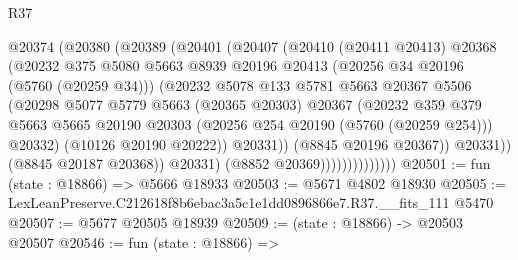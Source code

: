 \begin{lexlean}{R37}
\begin{coremodule}
                            @20374
                              (@20380
                                (@20389
                                  (@20401
                                    (@20407
                                      (@20410
                                        (@20411 @20413)
                                        @20368
                                        (@20232
                                          @375
                                          @5080
                                          @5663
                                          @8939
                                          @20196
                                          @20413
                                          (@20256 @34 @20196 (@5760 (@20259 @34)))
                                          (@20232
                                            @5078
                                            @133
                                            @5781
                                            @5663
                                            @20367
                                            @5506
                                            (@20298
                                              @5077
                                              @5779
                                              @5663
                                              (@20365 @20303)
                                              @20367
                                              (@20232
                                                @359
                                                @379
                                                @5663
                                                @5665
                                                @20190
                                                @20303
                                                (@20256 @254 @20190 (@5760 (@20259 @254)))
                                                @20332)
                                              (@10126 @20190 @20222))
                                            @20331))
                                        (@8845 @20196 @20367))
                                      @20331))
                                  (@8845 @20187 @20368))
                                @20331)
                              (@8852 @20369))))))))))))))
@20501 := fun (state : @18866) => @5666 @18933
@20503 := @5671 @4802 @18930
@20505 := LexLeanPreserve.C212618f8b6ebac3a5c1e1dd0896866e7.R37.__fits_111 @5470
@20507 := @5677 @20505 @18939
@20509 := (state : @18866) -> @20503 @20507
@20546 := fun (state : @18866) =>

\end{coremodule}
\end{lexlean}
